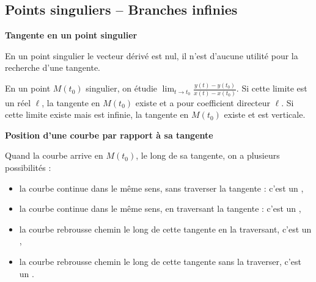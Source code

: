 \documentclass[10pt,class=article,crop=false]{standalone}
\begin{document}
\begin{multicols}{2}





\subsection{Points singuliers -- Branches infinies}



\textbf{Tangente en un point singulier}



En un point singulier le vecteur dérivé est nul, il n'est d'aucune utilité pour
la recherche d'une tangente.

En un point $M(t_0)$ singulier, on étudie
$\displaystyle \lim_{t\rightarrow t_0}\frac{y(t)-y(t_0)}{x(t)-x(t_0)}$.
Si cette limite est un réel $\ell$, la tangente en $M(t_0)$
existe et a pour coefficient directeur $\ell$.
Si cette limite existe mais est infinie, la tangente en $M(t_0)$
existe et est verticale.





\textbf{Position d'une courbe par rapport à sa tangente}


Quand la courbe arrive en $M(t_0)$, le long de sa tangente, on a
plusieurs possibilités :
\begin{itemize}
	\item la courbe continue dans le même sens, sans traverser la tangente :
	c'est un ,
	
	\item la courbe continue dans le même sens, en traversant la tangente :
	c'est un ,
	
	\item la courbe rebrousse chemin le long de
	cette tangente en la traversant, c'est un
	,
	
	\item la courbe rebrousse chemin le long de
	cette tangente sans la traverser, c'est un
	.
	
\end{itemize}


\end{multicols}
\end{document}
